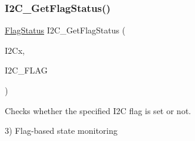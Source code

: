 \subsubsection{\texorpdfstring{I2\+C\+\_\+\+Get\+Flag\+Status()}{I2C\_GetFlagStatus()}}
{\footnotesize\ttfamily \hyperlink{group___exported__types_ga89136caac2e14c55151f527ac02daaff}{Flag\+Status} I2\+C\+\_\+\+Get\+Flag\+Status (\begin{DoxyParamCaption}\item[{\hyperlink{struct_i2_c___type_def}{I2\+C\+\_\+\+Type\+Def} $\ast$}]{I2\+Cx,  }\item[{uint32\+\_\+t}]{I2\+C\+\_\+\+F\+L\+AG }\end{DoxyParamCaption})}



Checks whether the specified I2C flag is set or not. 

3) Flag-\/based state monitoring

